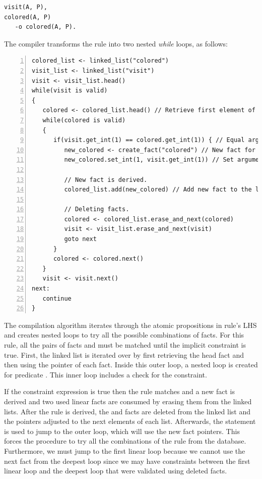 \begin{Verbatim}[fontsize=\codesize]
visit(A, P),
colored(A, P)
   -o colored(A, P).
\end{Verbatim}

The compiler transforms the rule into two nested \emph{while} loops, as follows:

\begin{Verbatim}[numbers=left,fontsize=\codesize]
colored_list <- linked_list("colored")
visit_list <- linked_list("visit")
visit <- visit_list.head()
while(visit is valid)
{
   colored <- colored_list.head() // Retrieve first element of the list.
   while(colored is valid)
   {
      if(visit.get_int(1) == colored.get_int(1)) { // Equal arguments?
         new_colored <- create_fact("colored") // New fact for predicate colored.
         new_colored.set_int(1, visit.get_int(1)) // Set arguments.

         // New fact is derived.
         colored_list.add(new_colored) // Add new fact to the linked list.

         // Deleting facts.
         colored <- colored_list.erase_and_next(colored)
         visit <- visit_list.erase_and_next(visit)
         goto next
      }
      colored <- colored.next()
   }
   visit <- visit.next()
next:
   continue
}
\end{Verbatim}

The compilation algorithm iterates through the atomic propositions in rule's LHS
and creates nested loops to try all the possible combinations of facts.  For
this rule, all the pairs of facts  and  must be
matched until the implicit constraint is true. First, the  linked
list is iterated over by first retrieving the head fact and then using the
 pointer of each fact. Inside this outer loop, a nested 
loop is created for predicate . This inner loop includes a check
for the constraint.

If the constraint expression is true then the rule matches and a new
 fact is derived and two used linear facts are consumed by erasing
them from the linked lists. After the rule is derived, the  and
 facts are deleted from the linked list and the pointers adjusted
to the next elements of each list. Afterwards, the  statement is
used to jump to the outer loop, which will use the new fact pointers. This
forces the procedure to try all the combinations of the rule from the database.
Furthermore, we must jump to the first linear loop because we cannot use the
next fact from the deepest loop since we may have constraints between the first
linear loop and the deepest loop that were validated using deleted facts.

